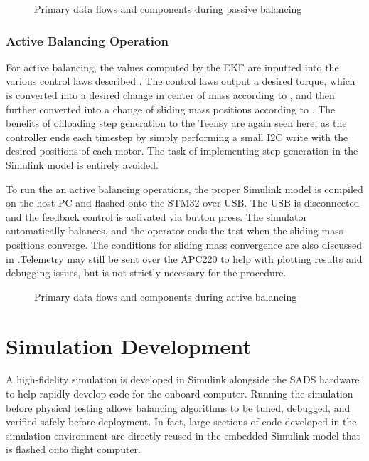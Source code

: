 \begin{figure}
    \centering
    
    \caption{Primary data flows and components during passive balancing}
    \label{fig:sys_arch_passive}
\end{figure}

\subsubsection{Active Balancing Operation}

For active balancing, the values computed by the EKF are inputted into the various control laws described . The control laws output a desired torque, which is converted into a desired change in center of mass according to , and then further converted into a change of sliding mass positions according to . The benefits of offloading step generation to the Teensy are again seen here, as the controller ends each timestep by simply performing a small I2C write with the desired positions of each motor. The task of implementing step generation in the Simulink model is entirely avoided. 

To run the an active balancing operations, the proper Simulink model is compiled on the host PC and flashed onto the STM32 over USB. The USB is disconnected and the feedback control is activated via button press. The simulator automatically balances, and the operator ends the test when the sliding mass positions converge. The conditions for sliding mass convergence are also discussed in .Telemetry may still be sent over the APC220 to help with plotting results and debugging issues, but is not strictly necessary for the procedure. 


\begin{figure}
    \centering
    
    \caption{Primary data flows and components during active balancing}
    \label{fig:sys_arch_active}
\end{figure}

\section{Simulation Development}\label{sec:sim_setup}

A high-fidelity simulation is developed in Simulink alongside the SADS hardware to help rapidly develop code for the onboard computer. Running the simulation before physical testing allows balancing algorithms to be tuned, debugged, and verified safely before deployment. In fact, large sections of code developed in the simulation environment are directly reused in the embedded Simulink model that is flashed onto flight computer.

